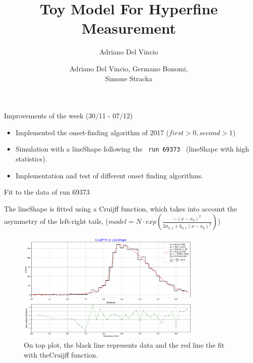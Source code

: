 \documentclass[8pt]{beamer}
\author{Adriano Del Vincio}
\title[Alpha 2]{Toy Model For Hyperfine Measurement}
\author[Adriano, Germano, Simone]{Adriano Del Vincio, Germano Bonomi,\\ Simone Stracka}
\institute[]{University of Brescia, INFN Pisa}
\begin{document}
\begin{frame}
\titlepage
\end{frame}

\begin{frame}{ Improvements of the week (30/11 - 07/12)}
\begin{itemize}
\item Implemented the onset-finding algorithm of 2017 ($first > 0 , second > 1$)
\item Simulation with a lineShape following the \texttt{ run 69373 } (lineShape with high statistics).
\item Implementation and test of different onset finding algorithms.
\end{itemize}
\end{frame}

\begin{frame}{Fit to the data of run 69373}

The lineShape is fitted using a Cruijff function, which takes into account the asymmetry of the left-right tails, ($model = N \cdot exp(  \frac{-(x - x_{0})^2}{2\sigma_{0,1} + k_{0,1}(x - x_{0})^{2}})$) 

\begin{figure}[hbtp]
\centering
\includegraphics[width = 0.8\textwidth ]{../LineShape/Plot/FitToLineShape.pdf}
\caption{On top plot, the black line represents data and the red line the fit with the\newline Cruijff function.}
\end{figure}
\end{frame}
\end{document}

